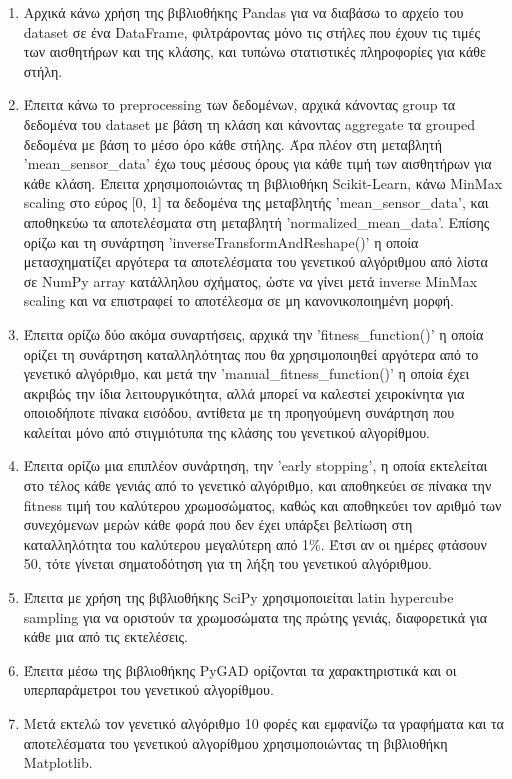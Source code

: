 \documentclass[12pt,a4paper]{article}
\begin{document}
\begin{enumerate}
    \item Αρχικά κάνω χρήση της βιβλιοθήκης Pandas για να διαβάσω το αρχείο του dataset σε ένα DataFrame, φιλτράροντας μόνο τις στήλες που έχουν τις τιμές των αισθητήρων και της κλάσης, και τυπώνω στατιστικές πληροφορίες για κάθε στήλη.
    \item Έπειτα κάνω το preprocessing των δεδομένων, αρχικά κάνοντας group τα δεδομένα του dataset με βάση τη κλάση και κάνοντας aggregate τα grouped δεδομένα με βάση το μέσο όρο κάθε στήλης. Άρα πλέον στη μεταβλητή 'mean\_sensor\_data' έχω τους μέσους όρους για κάθε τιμή των αισθητήρων για κάθε κλάση. Έπειτα χρησιμοποιώντας τη βιβλιοθήκη Scikit-Learn, κάνω MinMax scaling στο εύρος [0, 1] τα δεδομένα της μεταβλητής 'mean\_sensor\_data', και αποθηκεύω τα αποτελέσματα στη μεταβλητή 'normalized\_mean\_data'. Επίσης ορίζω και τη συνάρτηση 'inverseTransformAndReshape()' η οποία μετασχηματίζει αργότερα τα αποτελέσματα του γενετικού αλγόριθμου από λίστα σε ΝumPy array κατάλληλου σχήματος, ώστε να γίνει μετά inverse MinMax scaling και να επιστραφεί το αποτέλεσμα σε μη κανονικοποιημένη μορφή.
    \item Έπειτα ορίζω δύο ακόμα συναρτήσεις, αρχικά την 'fitness\_function()' η οποία ορίζει τη συνάρτηση καταλληλότητας που θα χρησιμοποιηθεί αργότερα από το γενετικό αλγόριθμο, και μετά την 'manual\_fitness\_function()' η οποία έχει ακριβώς την ίδια λειτουργικότητα, αλλά μπορεί να καλεστεί χειροκίνητα για οποιοδήποτε πίνακα εισόδου, αντίθετα με τη προηγούμενη συνάρτηση που καλείται μόνο από στιγμιότυπα της κλάσης του γενετικού αλγορίθμου.
    \item Έπειτα ορίζω μια επιπλέον συνάρτηση, την 'early stopping', η οποία εκτελείται στο τέλος κάθε γενιάς από το γενετικό αλγόριθμο, και αποθηκεύει σε πίνακα την fitness τιμή του καλύτερου χρωμοσώματος, καθώς και αποθηκεύει τον αριθμό των συνεχόμενων μερών κάθε φορά που δεν έχει υπάρξει βελτίωση στη καταλληλότητα του καλύτερου μεγαλύτερη από 1\%. Έτσι αν οι ημέρες φτάσουν 50, τότε γίνεται σηματοδότηση για τη λήξη του γενετικού αλγόριθμου.
    \item Έπειτα με χρήση της βιβλιοθήκης SciPy χρησιμοποιείται latin hypercube sampling για να οριστούν τα χρωμοσώματα της πρώτης γενιάς, διαφορετικά για κάθε μια από τις εκτελέσεις.
    \item Έπειτα μέσω της βιβλιοθήκης PyGAD ορίζονται τα χαρακτηριστικά και οι υπερπαράμετροι του γενετικού αλγορίθμου.
    \item Μετά εκτελώ τον γενετικό αλγόριθμο 10 φορές και εμφανίζω τα γραφήματα και τα αποτελέσματα του γενετικού αλγορίθμου χρησιμοποιώντας τη βιβλιοθήκη Matplotlib.

\end{enumerate}
\end{document}
